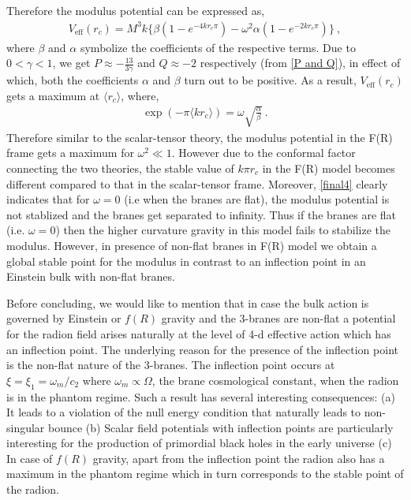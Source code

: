 \documentclass{article}
\begin{document}
Therefore the modulus potential can be expressed as,
\begin{eqnarray}
 V_\mathrm{eff}(r_c) = M^3k\bigg\{\beta\left(1 - e^{-4kr_c\pi}\right) - \omega^2\alpha\left(1-e^{-2kr_c\pi}\right)\bigg\}~,
 \label{final4}
\end{eqnarray}
where $\beta$ and $\alpha$ symbolize the coefficients of the respective terms. Due to $0 < \gamma < 1$, we get $P \approx -\frac{13}{3\gamma}$ and 
$Q \approx -2$ respectively (from \ref{P and Q}), in effect of which, both the coefficients $\alpha$ and $\beta$ turn out to be positive. 
As a result, $V_\mathrm{eff}(r_c)$ gets a maximum at $\langle r_c \rangle$, where,
\begin{eqnarray}
 \exp{\left(-\pi\langle  kr_c \rangle\right)} = \omega\sqrt{\frac{\alpha}{\beta}}~.
 \label{final5}
\end{eqnarray}
Therefore similar to the scalar-tensor theory, the modulus potential in the F(R) frame gets a maximum for $\omega^2 \ll 1$. However due to the 
conformal factor connecting the two theories, the stable value of $k\pi r_c$ in the F(R) model becomes different 
compared to that in the scalar-tensor frame. Moreover, \ref{final4} clearly indicates that for $\omega = 0$ (i.e when the branes are flat), the 
modulus potential is not stablized and the branes get separated to infinity. Thus if the branes are flat (i.e. $\omega=0$) then the higher curvature gravity in this model fails to stabilize the modulus. However, in presence of non-flat branes in F(R) model we obtain a global stable point for the modulus in contrast to an inflection point in an Einstein bulk with non-flat branes.



Before concluding, we would like to mention that in case the bulk action is governed by Einstein or $f(R)$ gravity and 
the 3-branes are non-flat a potential for the radion field arises naturally at the level of 4-d effective action which has an inflection point. 
The underlying reason for the presence of the inflection point is the non-flat nature of the 3-branes. 
The inflection point occurs at $\xi=\xi_1=\omega_m/c_2$ where $\omega_m \propto \Omega$, the brane cosmological constant, 
when the radion is in the phantom regime. Such a result has several interesting consequences: (a) It leads to a violation of the null energy 
condition that naturally leads to non-singular bounce (b) Scalar field potentials with inflection
points are particularly interesting for the production of primordial black holes in the early universe (c) In case of $f(R)$ gravity, 
apart from the inflection point the radion also has a maximum in the phantom regime which in turn corresponds to the stable point of the radion.
\end{document}
